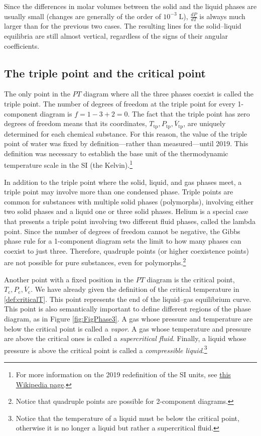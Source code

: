 \documentclass[
  9pt,
]{extbook}
\theoremstyle{definition}
\theoremstyle{definition}
\theoremstyle{definition}
\theoremstyle{definition}
\theoremstyle{remark}
\begin{document}
Since the differences in molar volumes between the solid and the liquid phases are usually small (changes are generally of the order of \(10^{-3}\;\mathrm{L}\)), \(\frac{dP}{dT}\) is always much larger than for the previous two cases. The resulting lines for the solid--liquid equilibria are still almost vertical, regardless of the signs of their angular coefficients.

\subsection{The triple point and the critical point}\label{the-triple-point-and-the-critical-point}

The only point in the \(PT\) diagram where all the three phases coexist is called the triple point. The number of degrees of freedom at the triple point for every 1-component diagram is \(f=1-3+2=0\). The fact that the triple point has zero degrees of freedom means that its coordinates, \({T_{\text{tp}},P_{\text{tp}},\overline{V}_{\text{tp}}}\), are uniquely determined for each chemical substance. For this reason, the value of the triple point of water was fixed by definition---rather than measured---until 2019. This definition was necessary to establish the base unit of the thermodynamic temperature scale in the SI (the Kelvin).\footnote{For more information on the 2019 redefinition of the SI units, see \href{https://en.wikipedia.org/wiki/2019_redefinition_of_the_SI_base_units}{this Wikipedia page}.}

In addition to the triple point where the solid, liquid, and gas phases meet, a triple point may involve more than one condensed phase. Triple points are common for substances with multiple solid phases (polymorphs), involving either two solid phases and a liquid one or three solid phases. Helium is a special case that presents a triple point involving two different fluid phases, called the lambda point. Since the number of degrees of freedom cannot be negative, the Gibbs phase rule for a 1-component diagram sets the limit to how many phases can coexist to just three. Therefore, quadruple points (or higher coexistence points) are not possible for pure substances, even for polymorphs.\footnote{Notice that quadruple points are possible for 2-component diagrams.}

Another point with a fixed position in the \(PT\) diagram is the critical point, \({T_{\text{c}},P_{\text{c}},\overline{V}_{\text{c}}}\). We have already given the definition of the critical temperature in \ref{def:criticalT}. This point represents the end of the liquid--gas equilibrium curve. This point is also semantically important to define different regions of the phase diagram, as in Figure \ref{fig:FigPhase3}. A gas whose pressure and temperature are below the critical point is called a \emph{vapor}. A gas whose temperature and pressure are above the critical ones is called a \emph{supercritical fluid}. Finally, a liquid whose pressure is above the critical point is called a \emph{compressible liquid}.\footnote{Notice that the temperature of a liquid must be below the critical point, otherwise it is no longer a liquid but rather a supercritical fluid.}
\end{document}
